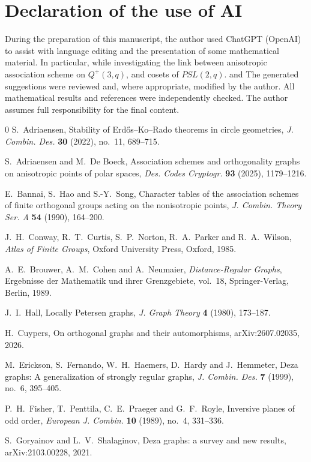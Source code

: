 \documentclass{article}
\theoremstyle{plain}
\begin{document}
\section*{Declaration of the use of AI}
During the preparation of this manuscript, the author used ChatGPT (OpenAI) to assist with language editing and the presentation of some mathematical material. In particular, while investigating the link between anisotropic association scheme on $Q^+(3,q)$, and cosets of $PSL(2,q)$. and The generated suggestions were reviewed and, where appropriate, modified by the author. All mathematical results and references were independently checked. The author assumes full responsibility for the final content.

 \begin{thebibliography}{0}
S.~Adriaensen,
\newblock Stability of Erd\H{o}s--Ko--Rado theorems in circle geometries,
\newblock \emph{J. Combin. Des.} \textbf{30} (2022), no.~11, 689--715.

S.~Adriaensen and M.~De Boeck,
\newblock Association schemes and orthogonality graphs on anisotropic
points of polar spaces,
\newblock \emph{Des. Codes Cryptogr.} \textbf{93} (2025), 1179--1216.


E.~Bannai, S.~Hao and S.-Y.~Song,
\newblock Character tables of the association schemes of finite
orthogonal groups acting on the nonisotropic points,
\newblock \emph{J. Combin. Theory Ser. A} \textbf{54} (1990), 164--200.


J.~H.~Conway, R.~T.~Curtis, S.~P.~Norton, R.~A.~Parker and R.~A.~Wilson,
\newblock \emph{Atlas of Finite Groups},
\newblock Oxford University Press, Oxford, 1985.

A.~E.~Brouwer, A.~M.~Cohen and A.~Neumaier,
\newblock \emph{Distance-Regular Graphs},
\newblock Ergebnisse der Mathematik und ihrer Grenzgebiete, vol.~18,
Springer-Verlag, Berlin, 1989.

J.~I.~Hall,
\newblock Locally Petersen graphs,
\newblock \emph{J. Graph Theory} \textbf{4} (1980), 173--187.

H.~Cuypers,
\newblock On orthogonal graphs and their automorphisms,
\newblock arXiv:2607.02035, 2026.

M.~Erickson, S.~Fernando, W.~H.~Haemers, D.~Hardy and J.~Hemmeter,
\newblock Deza graphs: A generalization of strongly regular graphs,
\newblock \emph{J. Combin. Des.} \textbf{7} (1999), no.~6, 395--405.

P.~H.~Fisher, T.~Penttila, C.~E.~Praeger and G.~F.~Royle,
\newblock Inversive planes of odd order,
\newblock \emph{European J. Combin.} \textbf{10} (1989), no.~4, 331--336.

S.~Goryainov and L.~V.~Shalaginov,
\newblock Deza graphs: a survey and new results,
\newblock arXiv:2103.00228, 2021. 

\end{thebibliography}
\end{document}
